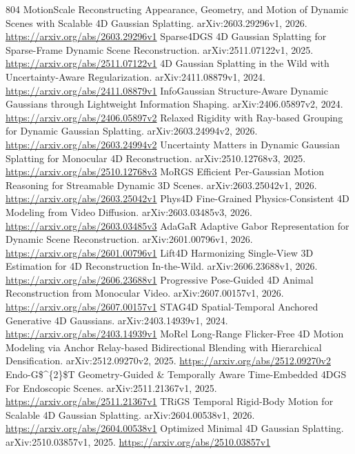 \documentclass[11pt]{article}
\begin{document}
\begin{thebibliography}{804}
 MotionScale Reconstructing Appearance, Geometry, and Motion of Dynamic Scenes with Scalable 4D Gaussian Splatting. arXiv:2603.29296v1, 2026. \url{https://arxiv.org/abs/2603.29296v1}
 Sparse4DGS 4D Gaussian Splatting for Sparse-Frame Dynamic Scene Reconstruction. arXiv:2511.07122v1, 2025. \url{https://arxiv.org/abs/2511.07122v1}
 4D Gaussian Splatting in the Wild with Uncertainty-Aware Regularization. arXiv:2411.08879v1, 2024. \url{https://arxiv.org/abs/2411.08879v1}
 InfoGaussian Structure-Aware Dynamic Gaussians through Lightweight Information Shaping. arXiv:2406.05897v2, 2024. \url{https://arxiv.org/abs/2406.05897v2}
 Relaxed Rigidity with Ray-based Grouping for Dynamic Gaussian Splatting. arXiv:2603.24994v2, 2026. \url{https://arxiv.org/abs/2603.24994v2}
 Uncertainty Matters in Dynamic Gaussian Splatting for Monocular 4D Reconstruction. arXiv:2510.12768v3, 2025. \url{https://arxiv.org/abs/2510.12768v3}
 MoRGS Efficient Per-Gaussian Motion Reasoning for Streamable Dynamic 3D Scenes. arXiv:2603.25042v1, 2026. \url{https://arxiv.org/abs/2603.25042v1}
 Phys4D Fine-Grained Physics-Consistent 4D Modeling from Video Diffusion. arXiv:2603.03485v3, 2026. \url{https://arxiv.org/abs/2603.03485v3}
 AdaGaR Adaptive Gabor Representation for Dynamic Scene Reconstruction. arXiv:2601.00796v1, 2026. \url{https://arxiv.org/abs/2601.00796v1}
 Lift4D Harmonizing Single-View 3D Estimation for 4D Reconstruction In-the-Wild. arXiv:2606.23688v1, 2026. \url{https://arxiv.org/abs/2606.23688v1}
 Progressive Pose-Guided 4D Animal Reconstruction from Monocular Video. arXiv:2607.00157v1, 2026. \url{https://arxiv.org/abs/2607.00157v1}
 STAG4D Spatial-Temporal Anchored Generative 4D Gaussians. arXiv:2403.14939v1, 2024. \url{https://arxiv.org/abs/2403.14939v1}
 MoRel Long-Range Flicker-Free 4D Motion Modeling via Anchor Relay-based Bidirectional Blending with Hierarchical Densification. arXiv:2512.09270v2, 2025. \url{https://arxiv.org/abs/2512.09270v2}
 Endo-G\$\textasciicircum{}\{2\}\$T Geometry-Guided \& Temporally Aware Time-Embedded 4DGS For Endoscopic Scenes. arXiv:2511.21367v1, 2025. \url{https://arxiv.org/abs/2511.21367v1}
 TRiGS Temporal Rigid-Body Motion for Scalable 4D Gaussian Splatting. arXiv:2604.00538v1, 2026. \url{https://arxiv.org/abs/2604.00538v1}
 Optimized Minimal 4D Gaussian Splatting. arXiv:2510.03857v1, 2025. \url{https://arxiv.org/abs/2510.03857v1}

\end{thebibliography}
\end{document}
